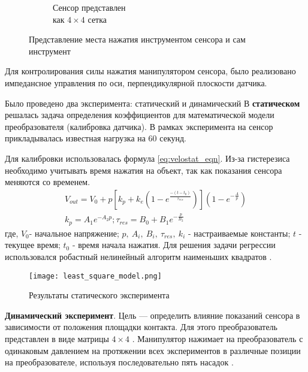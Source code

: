 \begin{figure}[ht]
\begin{subfigure}{0.38\textwidth}
        \caption{Сенсор представлен \\ как $4\times4$ сетка}
        \label{fig:sensor_grid}
    \end{subfigure}
    \caption{Представление места нажатия инструментом сенсора и сам инструмент}
\end{figure}

Для контролирования силы нажатия манипулятором сенсора, было реализовано импедансное управления по оси, перпендикулярной плоскости датчика.

Было проведено два эксперимента: статический и динамический В \textbf{статическом} решалась задача определения коэффициентов для математической модели преобразователя (калибровка датчика). В рамках эксперимента на сенсор прикладывалась известная нагрузка на 60 секунд.

Для калибровки использовалась формула \eqref{eq:velostat_eqn}. Из-за гистерезиса необходимо учитывать время нажатия на объект, так как показания сенсора меняются со временем.
\begin{align}
    \label{eq:velostat_eqn}
    V_{out} = V_0 + p[k_p + k_e(1-e^\frac{-(t-t_0)}{\tau_{res}})](1-e^{-\frac{A}{p}}) \\
    k_p = A_1e^{-A_2p}; \tau_{res} = B_0 + B_1e^{-\frac{p}{B_2}}
\end{align}
где,  $V_0$- начальное напряжение; $p,\ A_i,\ B_i,\ \tau_{res},\ k_i$  - настраиваемые константы; $t$ - текущее время; $t_0$ - время начала нажатия.
Для решения задачи регрессии использовался робастный нелинейный алгоритм наименьших квадратов .

\begin{figure}[H]
    \centering\texttt{[image: least\_square\_model.png]}
    \caption{Результаты статического эксперимента}
    \label{fig:least_square_model.png}
\end{figure}

\textbf{Динамический эксперимент}. Цель --- определить влияние показаний сенсора в зависимости от положения площадки контакта. Для этого преобразователь представлен в виде матрицы $4 \times 4$ . Манипулятор нажимает на преобразователь с одинаковым давлением на протяжении всех экспериментов в различные позиции на преобразователе, используя последовательно пять насадок .




